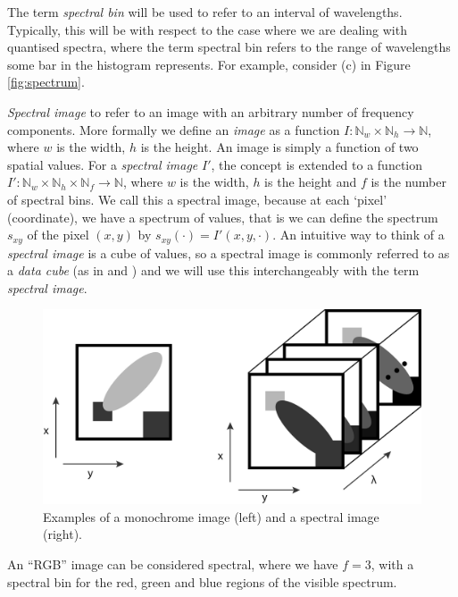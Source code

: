 \documentclass[12pt,twoside,notitlepage]{report}
\newcommand{\bb}[1]{\mathbb{#1}}
\begin{document}
        The term \textit{spectral bin} will be used to refer to an interval of wavelengths. Typically, this will be with 
        respect to the case where we are dealing with quantised spectra, where the term spectral bin refers to the range of 
        wavelengths some bar in the histogram represents. For example, consider (c) in Figure \ref{fig:spectrum}.

        \textit{Spectral image} to refer to an image with an arbitrary number of frequency components. More 
        formally we define an \textit{image} as a function $I : \bb{N}_w \times \bb{N}_h \rightarrow \bb{N}$, 
        where $w$ is the width, $h$ is the height. An image 
        is simply a function of two spatial values. For a \textit{spectral image} $I'$, the concept is extended to a 
        function $I' : \bb{N}_w \times \bb{N}_h \times \bb{N}_f \rightarrow \bb{N}$, where $w$ is the width, 
        $h$ is the height and $f$ is the number of spectral bins. We call this a spectral image, because at each `pixel' 
        (coordinate), we have a spectrum of values, that is we can define the spectrum $s_{xy}$ of the pixel $(x,y)$ by
        $s_{xy}(\cdot) = I'(x,y,\cdot)$. An intuitive way to think of a \textit{spectral image} is a cube of values, so 
        a spectral image is commonly referred to as a \textit{data cube} (as in \cite{Qingli:2013:spectralImagingTech} 
        and \cite{Bioucas-Dias:2012:unmixingOverview}) and we will use this interchangeably with the term 
        \textit{spectral image}.

        \begin{figure}
            \centering
            \includegraphics[scale=0.25]{spectral_image}
            \caption{Examples of a monochrome image (left) and a spectral image (right).}
        \end{figure}

        An ``RGB'' image can be considered spectral, where we have $f=3$, with a 
        spectral bin for the red, green and blue regions of the visible spectrum.
\end{document}
